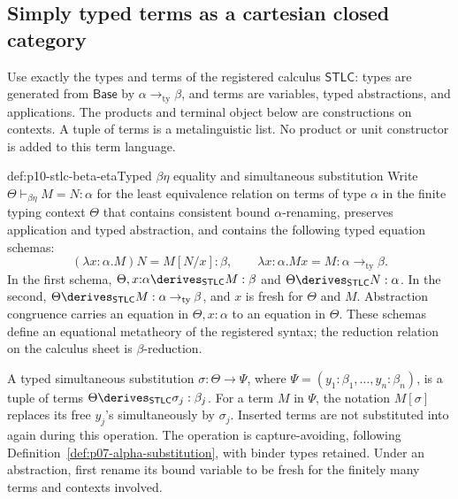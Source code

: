 
\subsection{Simply typed terms as a cartesian closed category}
\label{sec:p10-cartesian-lambda}

Use exactly the types and terms of the registered calculus
\hyperref[sheet:stlc]{\(\mathsf{STLC}\)}: types are generated from
\(\mathsf{Base}\) by \(\alpha\mathbin{\to_{\mathrm{ty}}}\beta\),
and terms are variables, typed abstractions, and applications.
The products and terminal object below are constructions on
contexts.  A tuple of terms is a metalinguistic list.
No product or unit constructor is added to this term language.

\begin{hbdefinition}{def:p10-stlc-beta-eta}{Typed \(\beta\eta\) equality and simultaneous substitution}
Write \(\Theta\vdash_{\beta\eta}M=N:\alpha\) for the least
equivalence relation on terms of type \(\alpha\) in the finite
typing context \(\Theta\) that contains consistent bound
\(\alpha\)-renaming, preserves application and typed abstraction,
and contains the following typed equation schemas:
\[
 (\lambda x{:}\alpha.M)N = M[N/x]:\beta,
 \qquad
 \lambda x{:}\alpha.Mx=M:
                  \alpha\mathbin{\to_{\mathrm{ty}}}\beta.
\]
In the first schema,
\(\Theta,x{:}\alpha\derives_{\mathsf{STLC}}M:\beta\) and
\(\Theta\derives_{\mathsf{STLC}}N:\alpha\).
In the second,
\(\Theta\derives_{\mathsf{STLC}}M:
 \alpha\mathbin{\to_{\mathrm{ty}}}\beta\), and \(x\) is fresh
for \(\Theta\) and \(M\).
Abstraction congruence carries an equation in
\(\Theta,x{:}\alpha\) to an equation in \(\Theta\).
These schemas define an equational metatheory of the registered
syntax; the reduction relation on the calculus sheet is
\(\beta\)-reduction.

A typed simultaneous substitution \(\sigma:\Theta\to\Psi\),
where \(\Psi=(y_1{:}\beta_1,\ldots,y_n{:}\beta_n)\), is a tuple
of terms \(\Theta\derives_{\mathsf{STLC}}\sigma_j:\beta_j\).
For a term \(M\) in \(\Psi\), the notation \(M[\sigma]\)
replaces its free \(y_j\)'s simultaneously by \(\sigma_j\).
Inserted terms are not substituted into again during this
operation.  The operation is capture-avoiding, following
Definition~\ref{def:p07-alpha-substitution}, with binder types
retained.  Under an abstraction, first rename its bound variable
to be fresh for the finitely many terms and contexts involved.
\end{hbdefinition}

